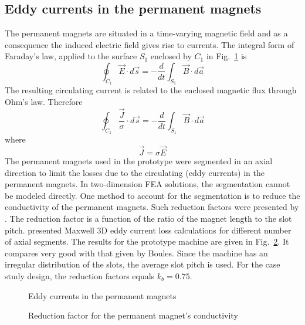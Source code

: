 \subsection{Eddy currents in the permanent magnets}
The permanent magnets are situated in a time-varying magnetic field and as a consequence the induced electric field gives rise to currents. The integral form of Faraday's law, applied to the surface $S_1$ enclosed by $C_1$ in Fig.~\ref{fig:f_pm_eddy} is
\begin{equation}
  \oint_{C_1}\vec{E}\cdot d\vec{s} = -\frac{d}{dt}\int_{S_1}\vec{B}\cdot d\vec{a}
\end{equation}
The resulting circulating current is related to the enclosed magnetic flux through Ohm's law. Therefore
\begin{equation}
  \oint_{C_1}\frac{\vec{J}}{\sigma}\cdot d\vec{s}=
  -\frac{d}{dt}\int_{S_1}\vec{B}\cdot d\vec{a}
\end{equation}
where
\begin{equation}
  \vec{J}= \sigma \vec{E}
\end{equation}
The permanent magnets used in the prototype were segmented in an axial direction to limit the losses due to the circulating (eddy currents) in the permanent magnets. In two-dimension FEA solutions, the segmentation cannot be modeled directly. One method to account for the segmentation is to reduce the conductivity of the permanent magnets. Such reduction factors were presented by \cite{Boules1980}. The reduction factor is a function of the ratio of the magnet length to the slot pitch. \cite{Stanton2008} presented Maxwell 3D eddy current loss calculations for different number of axial segments. The results for the prototype machine are given in Fig.~\ref{fig:f_boules}. It compares very good with that given by Boules. Since the machine has an irregular distribution of the slots, the average slot pitch is used. For the case study design, the reduction factors equals $k_b=0.75$. 
\begin{figure}[htbp]
  \centering
    
  \caption{Eddy currents in the permanent magnets}
  \label{fig:f_pm_eddy}
\end{figure}
\begin{figure}
  \centering
    
  \caption{Reduction factor for the permanent magnet's conductivity}
  \label{fig:f_boules}
\end{figure}

